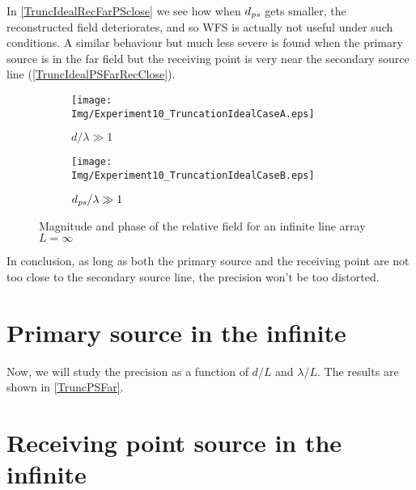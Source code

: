 In \autoref{TruncIdealRecFarPSclose} we see how when $d_{\PosTheoSubInd[primarySource]}$ gets smaller, the reconstructed field deteriorates, and so WFS is actually not useful under such conditions. A similar behaviour but much less severe is found when the primary source is in the far field but the receiving point is very near the secondary source line (\autoref{TruncIdealPSFarRecClose}).
\begin{figure}[h]
	\centering
	\begin{subfigure}[b]{0.49\textwidth}
		\centering
		\texttt{[image: Img/Experiment10\_TruncationIdealCaseA.eps]}
		\caption{$d/\lambda \gg 1$}
		\label{TruncIdealRecFarPSclose}
	\end{subfigure}
	\begin{subfigure}[b]{0.49\textwidth}
		\centering
		\texttt{[image: Img/Experiment10\_TruncationIdealCaseB.eps]}
		\caption{$d_{\PosTheoSubInd[primarySource]}/\lambda \gg 1$}
		\label{TruncIdealPSFarRecClose}
	\end{subfigure}
	\caption{Magnitude and phase of the relative field for an infinite line array $L = \infty$}
\end{figure}
In conclusion, as long as both the primary source and the receiving point are not too close to the secondary source line, the precision won't be too distorted.

\section{Primary source in the infinite}
Now, we will study the precision as a function of $d/L$ and $\lambda/L$. The results are shown in \autoref{TruncPSFar}.

\section{Receiving point source in the infinite}



